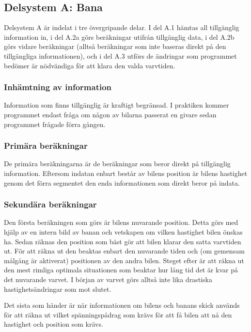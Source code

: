   \subsection{Delsystem A: Bana}
  
  Delsystem A är indelat i tre övergripande delar. I del A.1 hämtas all
  tillgänglig information in, i del A.2a görs beräkningar utifrån tillgänglig
  data, i del A.2b görs vidare beräkningar (alltså beräkningar som inte baseras
  direkt på den tillgängliga informationen), och i del A.3 utförs de ändringar
  som programmet bedömer är nödvändiga för att klara den valda varvtiden. 

    \subsubsection{Inhämtning av information}

    Information som finns tillgänglig är kraftigt begränsad. I praktiken kommer
    programmet endast fråga om någon av bilarna passerat en givare sedan
    programmet frågade förra gången.

    \subsubsection{Primära beräkningar}

    De primära beräkningarna är de beräkningar som beror direkt på tillgänglig
    information. Eftersom indatan enbart består av bilens position är bilens
    hastighet genom det förra segmentet den enda informationen som direkt beror
    på indata.

    \subsubsection{Sekundära beräkningar}
    
    Den första beräkningen som görs är bilens nuvarande position. Detta görs med
    hjälp av en intern bild av banan och vetskapen om vilken hastighet bilen
    önskas ha. Sedan räknas den position som bäst gör att bilen klarar den satta
    varvtiden ut. För att räkna ut den beaktas enbart den nuvarande tiden och
    (om gemensam målgång är aktiverat) positionen av den andra bilen. Steget
    efter är att räkna ut den mest rimliga optimala situationen som beaktar hur
    lång tid det är kvar på det nuvarande varvet. I början av varvet görs alltså
    inte lika drastiska hastighetsändringar som mot slutet.

    Det sista som händer är när informationen om bilens och banans skick används
    för att räkna ut vilket spänningspådrag som krävs för att få bilen att nå
    den hastighet och position som krävs.

